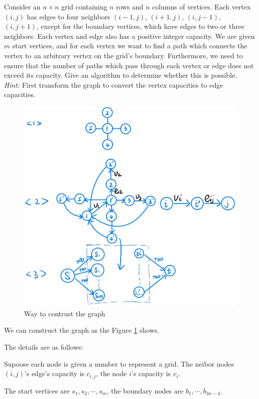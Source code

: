 \problem{}
Consider an $n \times n$ grid containing $n$ rows and $n$ columns of vertices.  Each vertex $(i, j)$ has edges to four neighbors $(i-1, j)$, $(i+1, j)$, $(i, j-1)$, $(i, j+1)$, except for the boundary vertices, which have edges to two or three neighbors.  Each vertex and edge also has a positive integer capacity.  We are given $m $ start vertices, and for each vertex we want to find a path which connects the vertex to an arbitrary vertex on the grid's boundary.  Furthermore, we need to ensure that the number of paths which pass through each vertex or edge does not exceed its capacity.  Give an algorithm to determine whether this is possible. \\

\noindent \emph{Hint:}  First transform the graph to convert the vertex capacities to edge capacities.  

\solution{}
\begin{figure}[htbp]
    \centering
    \includegraphics[width=0.9\linewidth]{../fig/p4.png}
    \caption{Way to contrust the graph}
    \label{fig:p4}
\end{figure}

We can construct the graph as the Figure \ref{fig:p4} shows.

The details are as follows:

Supoose each node is given a number to represent a grid. The neibor nodes $(i,j)$'s edge's capacity is $c_{i,j}$, the node $i$'s capacity is $v_i$.

The start vertices are $s_1,s_2,\cdots,s_m$, the boundary nodes are $b_1,\cdots,b_{4n-4}$.

